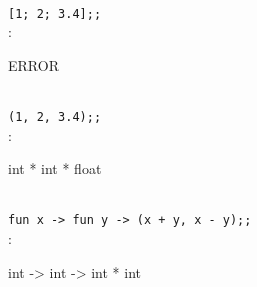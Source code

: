 \nextq
\\
\verb![1; 2; 3.4];;!
\\
\ANSWER:
\begin{answerlong}
ERROR
\end{answerlong}

\nextq
\\
\verb!(1, 2, 3.4);;!
\\
\ANSWER:
\begin{answerlong}
int * int * float
\end{answerlong}

\nextq
\\
\verb!fun x -> fun y -> (x + y, x - y);;!
\\
\ANSWER:
\begin{answerlong}
int -> int -> int * int
\end{answerlong}

\newpage


